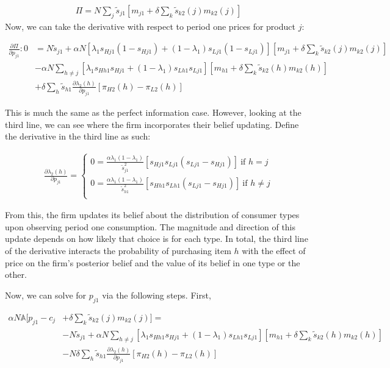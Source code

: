 \documentclass[11pt]{article}
\theoremstyle{definition}
\theoremstyle{remark}
\begin{document}
\begin{gather*}
  \Pi = N\sum_j\tilde{s}_{j1}[m_{j1} + \delta\sum_k\tilde{s}_{k2}(j)m_{k2}(j)]
\end{gather*}
Now, we can take the derivative with respect to period one prices for product $j$:

\begin{align*}
  \frac{\partial \Pi}{\partial p_{j1}}: 0 &= N\tilde{s}_{j1}+\alpha N[\lambda_1s_{Hj1}(1-s_{Hj1}) + (1-\lambda_1)s_{Lj1}(1-s_{Lj1})][m_{j1}+\delta\sum_k\tilde{s}_{k2}(j)m_{k2}(j)] \\
  &- \alpha N\sum_{h\ne j}[\lambda_1s_{Hh1}s_{Hj1} + (1-\lambda_1)s_{Lh1}s_{Lj1}][m_{h1} + \delta\sum_k\tilde{s}_{k2}(h)m_{k2}(h)] \\
  &+\delta\sum_h\tilde{s}_{h1}\frac{\partial\lambda_2(h)}{\partial p_{j1}}[\pi_{H2}(h) - \pi_{L2}(h)]
\end{align*}

This is much the same as the perfect information case. However, looking at the third line, we can see where the firm incorporates their belief updating. Define the derivative in the third line as such:

\begin{gather*}
  \frac{\partial\lambda_2(h)}{\partial p_{j1}} = 
  \begin{cases}
    0 = \frac{\alpha\lambda_1(1-\lambda_1)}{\tilde{s}_{j1}^2}[s_{Hj1}s_{Lj1}(s_{Lj1}-s_{Hj1})] \ \text{if $h=j$} \\
    0 = \frac{\alpha\lambda_1(1-\lambda_1)}{\tilde{s}_{h1}^2}[s_{Hh1}s_{Lh1}(s_{Lj1}-s_{Hj1})] \ \text{if $h\ne j$} \\
  \end{cases}
\end{gather*}

From this, the firm updates its belief about the distribution of consumer types upon observing period one consumption. The magnitude and direction of this update depends on how likely that choice is for each type. In total, the third line of the derivative interacts the probability of purchasing item $h$ with the effect of price on the firm's posterior belief and the value of its belief in one type or the other.

Now, we can solve for $p_{j1}$ via the following steps. First,

\begin{align*}
  \alpha N\mathbb{A}[p_{j1} - c_j &+ \delta\sum_k\tilde{s}_{k2}(j)m_{k2}(j)] =\\
  &- N\tilde{s}_{j1} + \alpha N\sum_{h\ne j}[\lambda_1s_{Hh1}s_{Hj1} + (1-\lambda_1)s_{Lh1}s_{Lj1}][m_{h1} + \delta\sum_{k}\tilde{s}_{k2}(h)m_{k2}(h)] \\
  &-N\delta\sum_h\tilde{s}_{h1}\frac{\partial\lambda_2(h)}{\partial p_{j1}}[\pi_{H2}(h) - \pi_{L2}(h)]
\end{align*}
\end{document}
